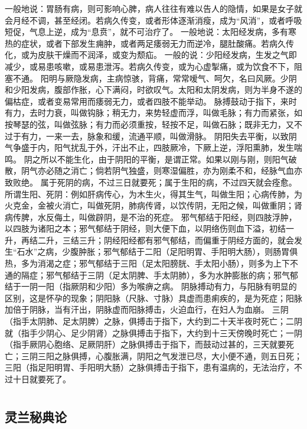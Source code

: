 \documentclass[a4paper,12pt,UTF8,twoside]{ctexbook}
\begin{document}
一般地说：胃肠有病，则可影响心脾，病人往往有难以告人的隐情，如果是女子就会月经不调，甚至经闭。若病久传变，或者形体逐渐消瘦，成为“风消”，或者呼吸短促，气息上逆，成为“息贲”，就不可治疗了。
一般地说：太阳经发病，多有寒热的症状，或者下部发生痈肿，或者两足痿弱无力而逆冷，腿肚酸痛。若病久传化，或为皮肤干燥而不润泽，或变为颓疝。
一般的说：少阳经发病，生发之气即减少，或易患咳嗽，或易患泄泻。若病久传变，或为心虚掣痛，或为饮食不下，阻塞不通。
阳明与厥隐发病，主病惊骇，背痛，常常嗳气、呵欠，名曰风厥。少阴和少阳发病，腹部作胀，心下满闷，时欲叹气。太阳和太阴发病，则为半身不遂的偏枯症，或者变易常用而痿弱无力，或者四肢不能举动。
脉搏鼓动于指下，来时有力，去时力衰，叫做钩脉；稍无力，来势轻虚而浮，叫做毛脉；有力而紧张，如按琴瑟的弦，叫做弦脉；有力而必须重按，轻按不足，叫做石脉；既非无力，又不过于有力，一来一去，脉象和缓，流通平顺，叫做滑脉。
阴阳失去平衡，以致阴气争盛于内，阳气扰乱于外，汗出不止，四肢厥冷，下厥上逆，浮阳熏肺，发生喘鸣。
阴之所以不能生化，由于阴阳的平衡，是谓正常。如果以刚与刚，则阳气破散，阴气亦必随之消亡；倘若阴气独盛，则寒湿偏胜，亦为刚柔不和，经脉气血亦致败绝。
属于死阴的病，不过三日就要死；属于生阳的病，不过四天就会痊愈。所谓生阳、死阴：例如肝病传心，为木生火，得其生气，叫做生阳；心病传肺，为火克金，金被火消亡，叫做死阴，肺病传肾，以饮传阴，无阳之候，叫做重阴；肾病传脾，水反侮土，叫做辟阴，是不治的死症。
邪气郁结于阳经，则四肢浮肿，以四肢为诸阳之本；邪气郁结于阴经，则大便下血，以阴络伤则血下溢，初结一升，再结二升，三结三升；阴经阳经都有邪气郁结，而偏重于阴经方面的，就会发生“石水”之病，少腹肿胀；邪气郁结于二阳（足阳明胃、手阳明大肠），则肠胃俱热，多为消渴之症；邪气郁结于三阳（足太阳膀胱、手太阳小肠），则多为上下不通的隔症；邪气郁结于三阴（足太阴脾、手太阴肺），多为水肿膨胀的病；邪气郁结于一阴一阳（指厥阴和少阳）多为喉痹之病。
阴脉搏动有力，与阳脉有明显的区别，这是怀孕的现象；阴阳脉（尺脉、寸脉）具虚而患痢疾的，是为死症；阳脉加倍于阴脉，当有汗出，阴脉虚而阳脉搏击，火迫血行，在妇人为血崩。
三阴（指手太阴肺、足太阴脾）之脉，俱搏击于指下，大约到二十天半夜时死亡；二阴就（指手少阴心、足少阴肾）之脉俱搏击于指下，大约到十三天傍晚时死亡；一阴（指手厥阴心胞络、足厥阴肝）之脉俱搏击于指下，而鼓动过甚的，三天就要死亡；三阴三阳之脉俱搏，心腹胀满，阴阳之气发泄已尽，大小便不通，则五日死；三阳（指足阳明胃、手阳明大肠）之脉俱搏击于指下，患有温病的，无法治疗，不过十日就要死了。

\part{}
\chapter{灵兰秘典论}
\end{document}
